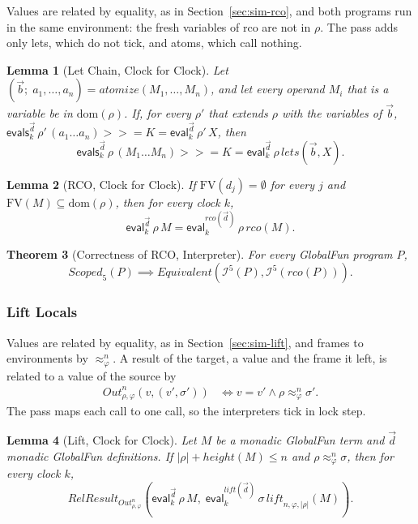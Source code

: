 \documentclass[10pt]{article}
\theoremstyle{acmplain}
\newtheorem{theorem}{Theorem}[section]
\newtheorem{lemma}[theorem]{Lemma}
\newcommand{\key}[1]{\mathsf{#1}}
\newcommand{\pass}[1]{\mathit{#1}}
\newcommand{\FV}{\mathrm{FV}}
\newcommand{\Equiv}{\mathit{Equivalent}}
\newcommand{\bind}{\mathbin{>\!\!>\!\!=}}
\newcommand{\RelRes}[1]{\mathit{RelResult}_{#1}}
\newcommand{\EV}[2]{\key{eval}^{#1}_{#2}}
\newcommand{\EVS}[2]{\key{evals}^{#1}_{#2}}
\newcommand{\Interp}[1]{\mathcal{I}^{#1}}
\begin{document}
Values are related by equality, as in Section~\ref{sec:sim-rco}, and
both programs run in the same environment: the fresh variables of rco
are not in $\rho$. The pass adds only lets, which do not tick, and atoms,
which call nothing.

\begin{lemma}[Let Chain, Clock for Clock]\label{lem:let-chain-clk}
Let $(\vec{b};\; a_1, \ldots, a_n) = \pass{atomize}(M_1, \ldots, M_n)$, and
let every operand $M_i$ that is a variable be in $\mathrm{dom}(\rho)$. If,
for every $\rho'$ that extends $\rho$ with the variables of $\vec{b}$,
$\EVS{\vec{d}}{k}\,\rho'\,(a_1 \ldots a_n) \bind K = \EV{\vec{d}}{k}\,\rho'\,X$, then
\[
  \EVS{\vec{d}}{k}\,\rho\,(M_1 \ldots M_n) \bind K = \EV{\vec{d}}{k}\,\rho\,\pass{lets}(\vec{b}, X) .
\]
\end{lemma}

\begin{lemma}[RCO, Clock for Clock]\label{lem:rco-clk}
If $\FV(d_j) = \emptyset$ for every $j$ and $\FV(M) \subseteq \mathrm{dom}(\rho)$,
then for every clock $k$,
\[
  \EV{\vec{d}}{k}\,\rho\,M = \EV{\pass{rco}(\vec{d})}{k}\,\rho\,\pass{rco}(M) .
\]
\end{lemma}

\begin{theorem}[Correctness of RCO, Interpreter]\label{thm:rco-clk}
For every GlobalFun program $P$,
\[
  \mathit{Scoped}_5(P) \implies \Equiv(\Interp{5}(P), \Interp{5}(\pass{rco}(P))) .
\]
\end{theorem}

\subsubsection{Lift Locals}

Values are related by equality, as in Section~\ref{sec:sim-lift}, and frames
to environments by $\approx^n_\varphi$. A result of the target, a value and
the frame it left, is related to a value of the source by
\begin{align*}
  \mathit{Out}^n_{\rho,\varphi}(v, (v', \sigma')) &\iff v = v' \land \rho \approx^n_\varphi \sigma' .
\end{align*}
The pass maps each call to one call, so the interpreters tick in lock step.

\begin{lemma}[Lift, Clock for Clock]\label{lem:lift-clk}
Let $M$ be a monadic GlobalFun term and $\vec{d}$ monadic GlobalFun definitions.
If $|\rho| + \mathit{height}(M) \leq n$ and $\rho \approx^n_\varphi \sigma$, then for every clock $k$,
\[
  \RelRes{\mathit{Out}^n_{\rho,\varphi}}(\EV{\vec{d}}{k}\,\rho\,M,\;
    \EV{\pass{lift}(\vec{d})}{k}\,\sigma\,\pass{lift}_{n,\varphi,|\rho|}(M)) .
\]
\end{lemma}
\end{document}
